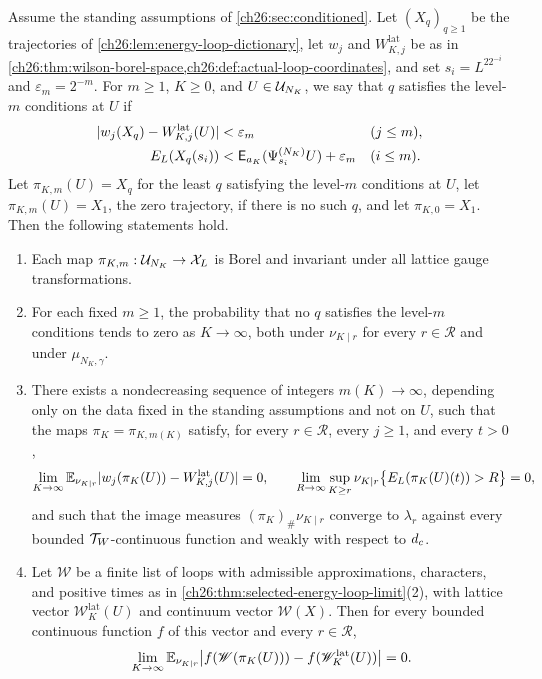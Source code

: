 \begin{theorem}\label{ch26:thm:energy-constrained-matching}
Assume the standing assumptions of \cref{ch26:sec:conditioned}. Let $(X_q)_{q\ge1}$ be the trajectories of \cref{ch26:lem:energy-loop-dictionary}, let $w_j$ and $W^{\mathrm{lat}}_{K,j}$ be as in \cref{ch26:thm:wilson-borel-space,ch26:def:actual-loop-coordinates}, and set $s_i=L^22^{-i}$ and $\varepsilon_m=2^{-m}$. For $m\ge1$, $K\ge0$, and $U\in\mathcal U_{N_K}$, we say that $q$ satisfies the level-$m$ conditions at $U$ if
\begin{equation}\label{ch26:eq:energy-constrained-feasibility}
 \begin{aligned}
 \lvert w_j(X_q)-W^{\mathrm{lat}}_{K,j}(U)\rvert&<\varepsilon_m &&(j\le m),\\
 E_L(X_q(s_i))&<\mathsf E_{a_K}(\Psi^{(N_K)}_{s_i}U)+\varepsilon_m &&(i\le m).
 \end{aligned}
\end{equation}
Let $\pi_{K,m}(U)=X_q$ for the least $q$ satisfying the level-$m$ conditions at $U$, let $\pi_{K,m}(U)=X_1$, the zero trajectory, if there is no such $q$, and let $\pi_{K,0}=X_1$. Then the following statements hold.
\begin{enumerate}
\item Each map $\pi_{K,m}:\mathcal U_{N_K}\to\mathcal X_L$ is Borel and invariant under all lattice gauge transformations.
\item For each fixed $m\ge1$, the probability that no $q$ satisfies the level-$m$ conditions tends to zero as $K\to\infty$, both under $\nu_{K\mid r}$ for every $r\in\mathcal R$ and under $\mu_{N_K,\gamma}$.
\item There exists a nondecreasing sequence of integers $m(K)\to\infty$, depending only on the data fixed in the standing assumptions and not on $U$, such that the maps $\pi_K=\pi_{K,m(K)}$ satisfy, for every $r\in\mathcal R$, every $j\ge1$, and every $t>0$,
\[
 \lim_{K\to\infty}\mathbb E_{\nu_{K\mid r}}\lvert w_j(\pi_K(U))-W^{\mathrm{lat}}_{K,j}(U)\rvert=0,\qquad \lim_{R\to\infty}\sup_{K\ge r}\nu_{K\mid r}\bigl\{E_L(\pi_K(U)(t))>R\bigr\}=0,
\]
and such that the image measures $(\pi_K)_\#\nu_{K\mid r}$ converge to $\lambda_r$ against every bounded $\mathcal T_W$-continuous function and weakly with respect to $d_c$.
\item Let $\mathscr W$ be a finite list of loops with admissible approximations, characters, and positive times as in \cref{ch26:thm:selected-energy-loop-limit}(2), with lattice vector $\mathscr W^{\mathrm{lat}}_K(U)$ and continuum vector $\mathscr W(X)$. Then for every bounded continuous function $f$ of this vector and every $r\in\mathcal R$,
\[
 \lim_{K\to\infty}\mathbb E_{\nu_{K\mid r}}\bigl\lvert f(\mathscr W(\pi_K(U)))-f(\mathscr W^{\mathrm{lat}}_K(U))\bigr\rvert=0 .
\]
\end{enumerate}
\end{theorem}

